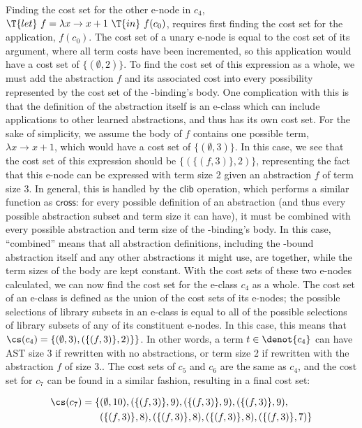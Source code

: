 Finding the cost set for the other e-node in $c_4$,
$\T{let}\ f = \lambda x \to x + 1\ \T{in}\ f(c_0)$,
requires first finding the cost set for the application, $f(c_0)$.
%
The cost set of a unary e-node is equal to the cost set of
its argument, where all term costs have been incremented,
so this application would have a cost set of
$\{ (\emptyset, 2) \}$.
%
To find the cost set of this expression as a whole, we must
add the abstraction $f$ and its associated cost into every
possibility represented by the cost set of the -binding's
body.
%
One complication with this is that the definition of the
abstraction itself is an e-class which can include applications
to other learned abstractions, and thus has its own cost set.
%
For the sake of simplicity, we assume the body of $f$ contains
one possible term, $\lambda x \to x + 1$, which would have
a cost set of $\{ (\emptyset, 3) \}$.
%
In this case, we see that the cost set of this expression should
be $\{ (\{ (f, 3) \}, 2) \}$, representing the fact that
this e-node can be expressed with term size 2 given an abstraction
$f$ of term size 3.
%
In general, this is handled by the $\mathsf{clib}$ operation,
which performs a similar function as $\mathsf{cross}$: for every
possible definition of an abstraction (and thus every possible
abstraction subset and term size it can have), it must be
combined with every possible abstraction and term size of the
-binding's body.
%
In this case, ``combined'' means that all abstraction definitions,
including the -bound abstraction itself and any other
abstractions it might use, are  together,
while the term sizes of the body are kept constant.
%
With the cost sets of these two e-nodes calculated, we can now
find the cost set for the e-class $c_4$ as a whole.
%
The cost set of an e-class is defined as the union of the cost sets
of its e-nodes;
the possible selections of library subsets in an e-class is equal to
all of the possible selections of library subsets of any of its
constituent e-nodes.
%
In this case, this means that
$\cs(c_4) = \{ (\emptyset, 3), (\{ (f, 3) \}, 2) \}\}$.
%
In other words, a term $t \in \denot{c_4}$ can have AST
size 3 if rewritten with no abstractions, or term size 2
if rewritten with the abstraction $f$ of size 3..
%
The cost sets of $c_5$ and $c_6$ are the same as $c_4$, and
the cost set for $c_7$ can be found in a similar fashion,
resulting in a final cost set:

\begin{align*}
\cs(c_7) = \{ &(\emptyset, 10), (\{ (f, 3) \}, 9), (\{ (f, 3) \}, 9), (\{ (f, 3) \}, 9), \\
&(\{ (f, 3) \}, 8), (\{ (f, 3) \}, 8), (\{ (f, 3) \}, 8), (\{ (f, 3) \}, 7) \}
\end{align*}

